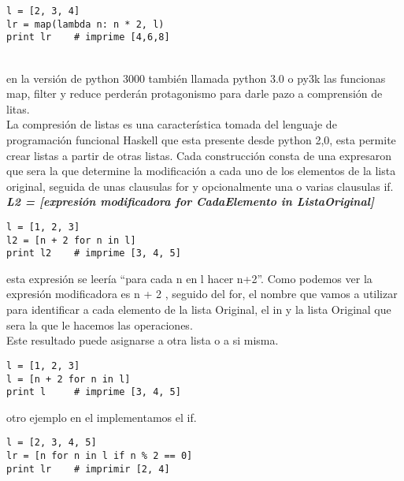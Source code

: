 \begin{multicols}{2}
\lstset{language=Python,frame=tb,framesep=5pt,basicstyle=\footnotesize}   
\begin{lstlisting}
l = [2, 3, 4]
lr = map(lambda n: n * 2, l)
print lr 	# imprime [4,6,8]
\end{lstlisting}

\\ %

en la versión de python 3000 también llamada python 3.0 o py3k las funcionas map, filter y reduce  
perderán protagonismo para darle pazo a comprensión de litas.\\
La compresión de listas es una característica tomada del lenguaje de programación funcional Haskell que esta presente desde python 2,0, esta permite crear listas a partir de otras listas.
Cada construcción consta de una expresaron que sera la que determine la modificación a cada uno de los elementos de la lista original, seguida de unas clausulas for y opcionalmente una o 
varias clausulas if.\\
\textit{\textbf{L2 = [expresión modificadora for CadaElemento in ListaOriginal]}}\\

\lstset{language=Python,frame=tb,framesep=5pt,basicstyle=\footnotesize}   
\begin{lstlisting}
l = [1, 2, 3]
l2 = [n + 2 for n in l]
print l2 	# imprime [3, 4, 5]
\end{lstlisting}
esta expresión se leería ``para cada n en l hacer n+2''. Como podemos ver la expresión modificadora es n + 2 , seguido del for,
el nombre que vamos a utilizar para identificar a cada elemento de la lista Original, el in  y la lista Original que sera la
que le hacemos las operaciones.\\
Este resultado puede asignarse a otra lista o a si misma.\\

\lstset{language=Python,frame=tb,framesep=5pt,basicstyle=\footnotesize}   
\begin{lstlisting}
l = [1, 2, 3]
l = [n + 2 for n in l]
print l 	# imprime [3, 4, 5]
\end{lstlisting}
otro ejemplo en el implementamos el if.\\

\lstset{language=Python,frame=tb,framesep=5pt,basicstyle=\footnotesize}   
\begin{lstlisting}
l = [2, 3, 4, 5]
lr = [n for n in l if n % 2 == 0]
print lr	# imprimir [2, 4]
\end{lstlisting}


\end{multicols}
